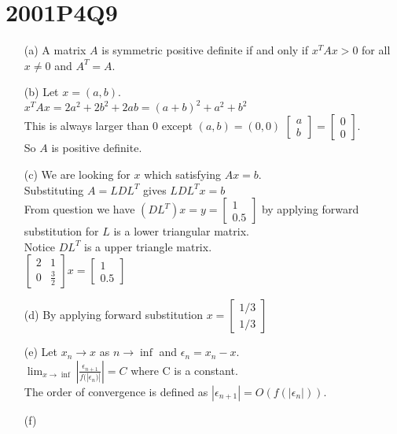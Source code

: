 \documentclass[10pt,twoside,a4paper]{article}
\begin{document}
\section*{2001P4Q9}
\begin{itemize}
\item[(a)]
A matrix $A$ is symmetric positive definite if and only if $x^TAx>0$ for all $x \neq 0$ and $A^T=A$.
\item[(b)]
Let $x=(a,b)$.
\\$x^TAx=2a^2+2b^2+2ab=(a+b)^2 + a^2 + b^2$ 
\\This is always larger than 0 except $(a,b)=(0,0)$ $\begin{bmatrix}
a\\b
\end{bmatrix}=\begin{bmatrix}
0\\0
\end{bmatrix}$.
\\So $A$ is positive definite.
\item[(c)]
We are looking for $x$ which satisfying $Ax=b$.
\\Substituting $A=LDL^T$ gives $LDL^Tx=b$
\\From question we have $(DL^T)x=y=\begin{bmatrix}
1\\0.5
\end{bmatrix}$ by applying forward substitution for $L$ is a lower triangular matrix.
\\Notice $DL^T$ is a upper triangle matrix.
\\$\begin{bmatrix}
2&1\\
0&\frac{3}{2}
\end{bmatrix} x= \begin{bmatrix}
1\\0.5
\end{bmatrix}$
\item[(d)]
By applying forward substitution $x=\begin{bmatrix}
1/3\\1/3
\end{bmatrix}$
\item[(e)]
Let $x_n \to x$ as $n\to \inf$ and $\epsilon_n=x_n-x$.
\\$\lim_{x\to \inf} |\frac{\epsilon_{n+1}}{f(|\epsilon_n)|}|=C$ where C is a constant.
\\The order of convergence is defined as $|\epsilon_{n+1}|=O(f(|\epsilon_n|))$.
\item[(f)]

\end{itemize}
\end{document}
